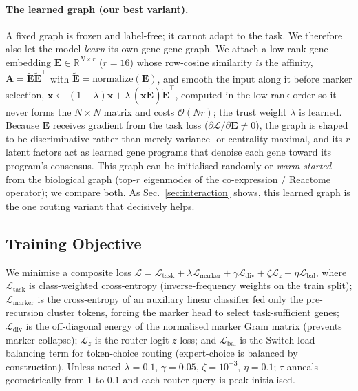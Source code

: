 \documentclass[letterpaper]{article}
\begin{document}
\paragraph{The learned graph (our best variant).}
A fixed graph is frozen and label-free; it cannot adapt to the task. We therefore also
let the model \emph{learn} its own gene-gene graph. We attach a low-rank gene embedding
$\mathbf{E}\in\mathbb{R}^{N\times r}$ ($r{=}16$) whose row-cosine similarity
\emph{is} the affinity, $\mathbf{A}=\tilde{\mathbf{E}}\tilde{\mathbf{E}}^{\top}$ with
$\tilde{\mathbf{E}}=\mathrm{normalize}(\mathbf{E})$, and smooth the input along it before
marker selection, $\mathbf{x}\leftarrow(1-\lambda)\mathbf{x}+\lambda\,(\mathbf{x}
\tilde{\mathbf{E}})\tilde{\mathbf{E}}^{\top}$, computed in the low-rank order so it never
forms the $N\times N$ matrix and costs $\mathcal{O}(Nr)$; the trust weight $\lambda$ is
learned. Because $\mathbf{E}$ receives gradient from the task loss
($\partial\mathcal{L}/\partial\mathbf{E}\neq 0$), the graph is shaped to be
discriminative rather than merely variance- or centrality-maximal, and its $r$ latent
factors act as learned gene programs that denoise each gene toward its program's
consensus. This graph can be initialised randomly or \emph{warm-started} from the
biological graph (top-$r$ eigenmodes of the co-expression / Reactome operator); we
compare both. As Sec.~\ref{sec:interaction} shows, this learned graph is the one routing
variant that decisively helps.

\subsection{Training Objective}
We minimise a composite loss
$\mathcal{L} = \mathcal{L}_{\mathrm{task}} + \lambda\mathcal{L}_{\mathrm{marker}}
+ \gamma\mathcal{L}_{\mathrm{div}} + \zeta\mathcal{L}_{z} + \eta\mathcal{L}_{\mathrm{bal}}$,
where $\mathcal{L}_{\mathrm{task}}$ is class-weighted cross-entropy (inverse-frequency
weights on the train split); $\mathcal{L}_{\mathrm{marker}}$ is the cross-entropy of
an auxiliary linear classifier fed only the pre-recursion cluster tokens, forcing the
marker head to select task-sufficient genes;
$\mathcal{L}_{\mathrm{div}}$ is the off-diagonal energy of the normalised marker Gram
matrix (prevents marker collapse); $\mathcal{L}_{z}$ is the router logit $z$-loss; and
$\mathcal{L}_{\mathrm{bal}}$ is the Switch load-balancing term
\cite{shazeer2017outrageously} for token-choice routing (expert-choice is balanced by
construction). Unless noted $\lambda{=}0.1$, $\gamma{=}0.05$, $\zeta{=}10^{-3}$,
$\eta{=}0.1$; $\tau$ anneals geometrically from $1$ to $0.1$ and each router query is
peak-initialised.
\end{document}
